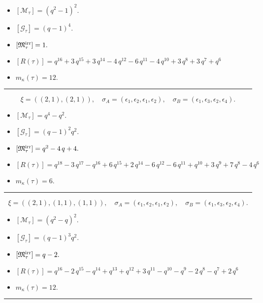 \documentclass[10pt,a4paper]{amsart}
\begin{document}
\begin{itemize}
 \item $[\mathcal{M}_{\tau}] = {\left(q^{2} - 1\right)}^{2} .$

 \item $[\mathcal{G}_{\tau}] = {\left(q - 1\right)}^{4} .$

 \item $[{\frak M}_{\tau}^{\textrm{irr}}] = 1 .$

 \item $[R(\tau)] = q^{16} + 3 \, q^{15} + 3 \, q^{14} - 4 \, q^{12} - 6 \, q^{11} - 4 \, q^{10} + 3 \, q^{8} + 3 \, q^{7} + q^{6} $

 \item $m_{\kappa}(\tau) = 12 .$

 \end{itemize}
\noindent\rule{8cm}{0.4pt}

$$\xi = ({(2, 1)}, {(2, 1)}),\quad \sigma_A = ({{\epsilon_1, \epsilon_2}}, {{\epsilon_1, \epsilon_2}}),\quad \sigma_B = ({{\epsilon_1, \epsilon_3}}, {{\epsilon_2, \epsilon_4}}).$$

\begin{itemize}
 \item $[\mathcal{M}_{\tau}] = q^{4} - q^{2} .$

 \item $[\mathcal{G}_{\tau}] = {\left(q - 1\right)}^{2} q^{2} .$

 \item $[{\frak M}_{\tau}^{\textrm{irr}}] = q^{2} - 4 \, q + 4 .$

 \item $[R(\tau)] = q^{18} - 3 \, q^{17} - q^{16} + 6 \, q^{15} + 2 \, q^{14} - 6 \, q^{12} - 6 \, q^{11} + q^{10} + 3 \, q^{9} + 7 \, q^{8} - 4 \, q^{6} $

 \item $m_{\kappa}(\tau) = 6 .$

 \end{itemize}
\noindent\rule{8cm}{0.4pt}

$$\xi = ({(2, 1)}, {(1, 1), (1, 1)}),\quad \sigma_A = ({{\epsilon_1, \epsilon_2}}, {{\epsilon_1}, {\epsilon_2}}),\quad \sigma_B = ({{\epsilon_1, \epsilon_3}}, {{\epsilon_2}, {\epsilon_4}}).$$

\begin{itemize}
 \item $[\mathcal{M}_{\tau}] = {\left(q^{2} - q\right)}^{2} .$

 \item $[\mathcal{G}_{\tau}] = {\left(q - 1\right)}^{3} q^{2} .$

 \item $[{\frak M}_{\tau}^{\textrm{irr}}] = q - 2 .$

 \item $[R(\tau)] = q^{16} - 2 \, q^{15} - q^{14} + q^{13} + q^{12} + 3 \, q^{11} - q^{10} - q^{9} - 2 \, q^{8} - q^{7} + 2 \, q^{6} $

 \item $m_{\kappa}(\tau) = 12 .$

 \end{itemize}
\noindent\rule{8cm}{0.4pt}
\end{document}
